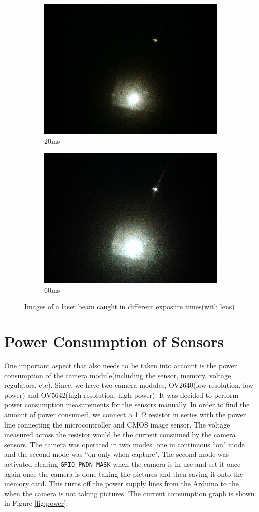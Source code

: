 \begin{figure}[ht]
        \begin{subfigure}{0.5\textwidth}
    \centering
        \includegraphics[width=0.5\linewidth]{pics/exposure/20ms}
        \caption{20ms}
        \label{fig:exp20ms}
    \end{subfigure}%
    \begin{subfigure}{0.5\textwidth}
    \centering
        \includegraphics[width=0.5\linewidth]{pics/exposure/60ms}
        \caption{60ms}
        \label{fig:exp60ms}
        
    \end{subfigure}    
    \caption{Images of a laser beam caught in different exposure times(with lens)}
    \label{fig:exptests}
    \end{figure}
    
\section{Power Consumption of Sensors}
 One important aspect that also needs to be taken into account is the power consumption of the camera module(including the sensor, memory, voltage regulators, etc). Since, we have two camera modules, OV2640(low resolution, low power) and OV5642(high resolution, high power). It was decided to perform power consumption measurements for the sensors manually. In order to find the amount of power consumed, we connect a 1 $\Omega$ resistor in series with the power line connecting the microcontroller and CMOS image sensor. The voltage measured across the resistor would be the current consumed by the camera sensors. The camera was operated in two modes: one in continuous ``on" mode and the second mode was ``on only when capture". The second mode was activated clearing \texttt{GPIO\_PWDN\_MASK} when the camera is in use and set it once again once the camera is done taking the pictures and then saving it onto the memory card. This turns off the power supply lines from the Arduino to the when the camera is not taking pictures. The current consumption graph is shown in Figure \ref{fig:power}.
 
